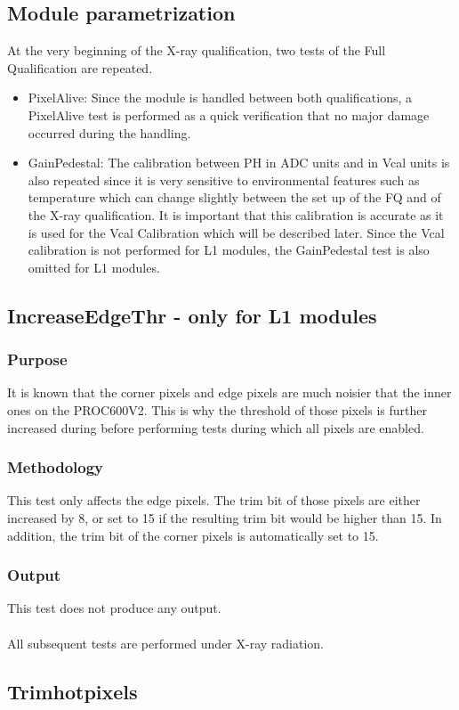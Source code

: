 \documentclass[a4paper,12pt,twoside]{article}
\begin{document}
\subsection{Module parametrization}
At the very beginning of the X-ray qualification, two tests of the Full Qualification are repeated. 
\begin{itemize}
\item PixelAlive: Since the module is handled between both qualifications, a PixelAlive test is performed as a quick verification that no major damage occurred during the handling.
\item GainPedestal: The calibration between PH in ADC units and in Vcal units is also repeated since it is very sensitive to environmental features such as temperature which can change slightly between the set up of the FQ and of the X-ray qualification. It is important that this calibration is accurate as it is used for the Vcal Calibration which will be described later. Since the Vcal calibration is not performed for L1 modules, the GainPedestal test is also omitted for L1 modules.
\end{itemize}
\subsection{IncreaseEdgeThr - only for L1 modules}
\subsubsection{Purpose}
It is known that the corner pixels and edge pixels are much noisier that the inner ones on the PROC600V2. This is why the threshold of those pixels is further increased during before performing tests during which all pixels are enabled.
\subsubsection{Methodology}
This test only affects the edge pixels. The trim bit of those pixels are either increased by 8, or set to 15 if the resulting trim bit would be higher than 15. In addition, the trim bit of the corner pixels is automatically set to 15.
\subsubsection{Output}
This test does not produce any output.
\\
\\
All subsequent tests are performed under X-ray radiation.
\subsection{Trimhotpixels}
\end{document}
